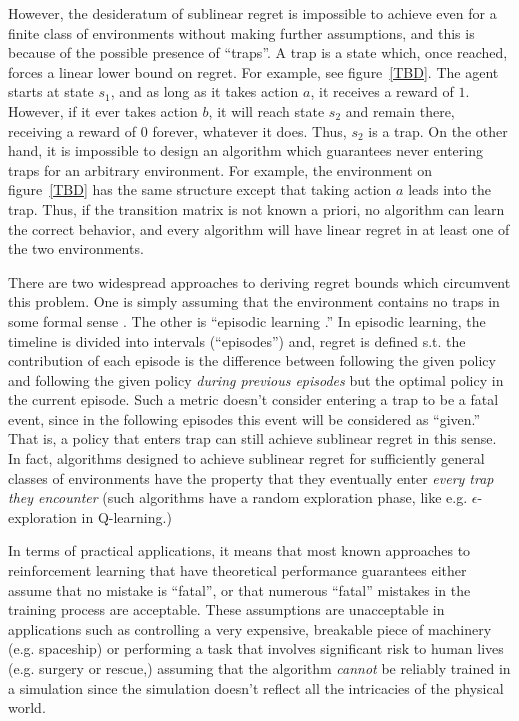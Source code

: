 \documentclass[anon,12pt]{colt2018} %
\begin{document}
However, the desideratum of sublinear regret is impossible to achieve even for a finite class of environments without making further assumptions, and this is because of the possible presence of \enquote{traps}. A trap is a state which, once reached, forces a linear lower bound on regret. For example, see figure~\ref{TBD}. The agent starts at state $s_1$, and as long as it takes action $a$, it receives a reward of $1$. However, if it ever takes action $b$, it will reach state $s_2$ and remain there, receiving a reward of $0$ forever, whatever it does. Thus, $s_2$ is a trap. On the other hand, it is impossible to design an algorithm which guarantees never entering traps for an arbitrary environment. For example, the environment on figure~\ref{TBD} has the same structure except that taking action $a$ leads into the trap. Thus, if the transition matrix is not known a priori, no algorithm can learn the correct behavior, and every algorithm will have linear regret in at least one of the two environments.

There are two widespread approaches to deriving regret bounds which circumvent this problem. One is simply assuming that the environment contains no traps in some formal sense \cite{TBD}. The other is \enquote{episodic learning \cite{TBD}.} In episodic learning, the timeline is divided into intervals (\enquote{episodes}) and, regret is defined s.t. the contribution of each episode is the difference between following the given policy and following the given policy \emph{during previous episodes} but the optimal policy in the current episode. Such a metric doesn't consider entering a trap to be a fatal event, since in the following episodes this event will be considered as \enquote{given.} That is, a policy that enters trap can still achieve sublinear regret in this sense. In fact, algorithms designed to achieve sublinear regret for sufficiently general classes of environments have the property that they eventually enter \emph{every trap they encounter} (such algorithms have a random exploration phase, like e.g. $\epsilon$-exploration in Q-learning.)

In terms of practical applications, it means that most known approaches to reinforcement learning that have theoretical performance guarantees either assume that no mistake is \enquote{fatal}, or that numerous \enquote{fatal} mistakes in the training process are acceptable. These assumptions are unacceptable in applications such as controlling a very expensive, breakable piece of machinery (e.g. spaceship) or performing a task that involves significant risk to human lives (e.g. surgery or rescue,) assuming that the algorithm \emph{cannot} be reliably trained in a simulation since the simulation doesn't reflect all the intricacies of the physical world.
\end{document}
